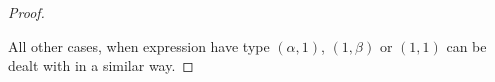 \begin{proof}
\begin{itemize}
\end{itemize}
All other cases, when expression have type $(\alpha,1)$, $(1,\beta)$ or $(1,1)$ can be dealt with in a similar way.
\end{proof}

